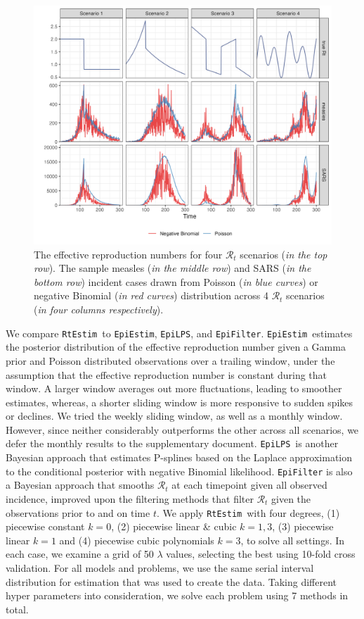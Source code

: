 \documentclass[10pt,letterpaper]{article}
\def\RtEstim{\texttt{RtEstim}}
\def\EpiEstim{\texttt{EpiEstim}}
\def\EpiLPS{\texttt{EpiLPS}}
\def\calR{\mathcal{R}}
\begin{document}
\begin{figure}[!ht]
  \centering
  \includegraphics[width=1.0\textwidth]{fig/fig_samples.png}
  \caption{The effective reproduction numbers for four $\calR_t$ scenarios (\textit{in the top row}). 
  The sample measles (\textit{in the middle row}) and SARS (\textit{in the bottom row}) incident cases drawn 
  from Poisson (\textit{in blue curves}) or negative Binomial (\textit{in red curves}) distribution 
  across 4 $\calR_t$ scenarios (\textit{in four columns respectively}).} 
  \label{fig:samples}
\end{figure}

We compare \RtEstim\ to \EpiEstim, \EpiLPS, and \texttt{EpiFilter}. \EpiEstim\ estimates
the posterior distribution of the effective reproduction number given a Gamma
prior and Poisson distributed observations
over a trailing window, under the assumption that the effective reproduction number is
constant during that window. A larger window averages out more
fluctuations,
leading to smoother estimates, whereas, a shorter sliding window is more
responsive to sudden spikes or declines. We tried the weekly sliding
window, as well as a monthly window. However, since neither considerably
outperforms the other across all scenarios, we defer the monthly results to the
supplementary document. \EpiLPS\ is another Bayesian approach that estimates P-splines 
based on the Laplace approximation to the conditional posterior with negative
Binomial likelihood. \texttt{EpiFilter} is also a Bayesian approach that smooths 
$\calR_t$ at each timepoint given all observed incidence, improved upon the filtering methods
that filter $\calR_t$ given the observations prior to and on time $t$.
We apply \RtEstim\ with four degrees, (1) piecewise constant $k=0$, (2) piecewise linear \& cubic $k=1,3$,
(3) piecewise linear $k=1$ and (4) piecewise cubic polynomials $k=3$, to solve all settings.
In each case, we examine a grid of 50 $\lambda$ values, selecting the best using 10-fold
cross validation. For all models and problems, we use the same serial interval
distribution for estimation that was used to create the data. 
Taking different hyper parameters into consideration, we solve each problem using 7 methods in total.
\end{document}

